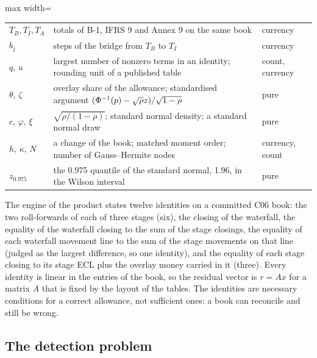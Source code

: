 \begin{table}[htbp]
\begin{adjustbox}{max width=\textwidth}
\begin{tabular}{lll}
$T_B, T_I, T_A$ & totals of B-1, IFRS 9 and Annex 9 on the same book & currency \\
$b_j$ & steps of the bridge from $T_B$ to $T_I$ & currency \\
$q$, $u$ & largest number of nonzero terms in an identity; rounding unit of a published table & count, currency \\
$\theta$, $\zeta$ & overlay share of the allowance; standardised argument $(\Phi^{-1}(p)-\sqrt\rho z)/\sqrt{1-\rho}$ & pure \\
$c$, $\varphi$, $\xi$ & $\sqrt{\rho/(1-\rho)}$; standard normal density; a standard normal draw & pure \\
$h$, $\kappa$, $N$ & a change of the book; matched moment order; number of Gauss--Hermite nodes & currency, count \\
$z_{0.975}$ & the 0.975 quantile of the standard normal, 1.96, in the Wilson interval & pure \\
\bottomrule
\end{tabular}
\end{adjustbox}
\end{table}

The engine of the product states twelve identities on a committed C06 book: the two roll-forwards of each of three stages (six), the closing of the waterfall, the equality of the waterfall closing to the sum of the stage closings, the equality of each waterfall movement line to the sum of the stage movements on that line (judged as the largest difference, so one identity), and the equality of each stage closing to its stage ECL plus the overlay money carried in it (three).
Every identity is linear in the entries of the book, so the residual vector is $r=Ax$ for a matrix $A$ that is fixed by the layout of the tables.
The identities are necessary conditions for a correct allowance, not sufficient ones: a book can reconcile and still be wrong.

\subsection{The detection problem}
\label{sec:problem-detection}

